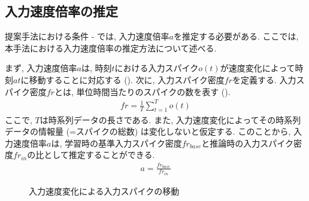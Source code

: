 \subsection{入力速度倍率の推定}
提案手法における条件 - では, 入力速度倍率$a$を推定する必要がある.
ここでは, 本手法における入力速度倍率の推定方法について述べる.

まず, 入力速度倍率$a$は, 時刻$t$における入力スパイク$o(t)$が速度変化によって時刻$at$に移動することに対応する ().
次に, 入力スパイク密度$fr$を定義する.
入力スパイク密度$fr$とは, 単位時間当たりのスパイクの数を表す ().
\begin{align}
    fr = \frac{1}{T} \sum_{t=1}^{T} o(t) \label{eq:input:spike:density}
\end{align}
ここで, $T$は時系列データの長さである.
また, 入力速度変化によってその時系列データの情報量 (=スパイクの総数) は変化しないと仮定する.
このことから, 入力速度倍率$a$は, 学習時の基準入力スパイク密度$fr_{base}$と推論時の入力スパイク密度$fr_{in}$の比として推定することができる.
\begin{align}
    a = \frac{fr_{base}}{fr_{in}}
\end{align}

\begin{figure}[htb]
    \centering
    
    \caption{入力速度変化による入力スパイクの移動}
    \label{fig:input:speed:change}
\end{figure}


